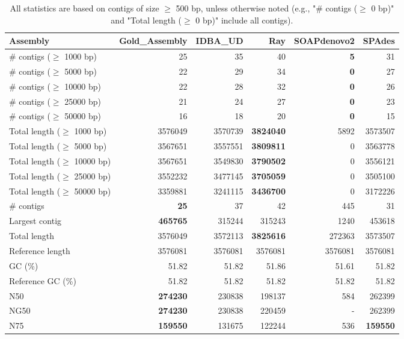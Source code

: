 \documentclass[12pt,a4paper]{article}
\begin{document}
\begin{table}[ht]
\begin{center}
\caption{All statistics are based on contigs of size $\geq$ 500 bp, unless otherwise noted (e.g., "\# contigs ($\geq$ 0 bp)" and "Total length ($\geq$ 0 bp)" include all contigs).}
\begin{tabular}{|l*{5}{|r}|}
\hline
Assembly & Gold\_Assembly & IDBA\_UD & Ray & SOAPdenovo2 & SPAdes \\ \hline
\# contigs ($\geq$ 1000 bp) & 25 & 35 & 40 & {\bf 5} & 31 \\ \hline
\# contigs ($\geq$ 5000 bp) & 22 & 29 & 34 & {\bf 0} & 27 \\ \hline
\# contigs ($\geq$ 10000 bp) & 22 & 28 & 32 & {\bf 0} & 26 \\ \hline
\# contigs ($\geq$ 25000 bp) & 21 & 24 & 27 & {\bf 0} & 23 \\ \hline
\# contigs ($\geq$ 50000 bp) & 16 & 18 & 20 & {\bf 0} & 15 \\ \hline
Total length ($\geq$ 1000 bp) & 3576049 & 3570739 & {\bf 3824040} & 5892 & 3573507 \\ \hline
Total length ($\geq$ 5000 bp) & 3567651 & 3557551 & {\bf 3809811} & 0 & 3563778 \\ \hline
Total length ($\geq$ 10000 bp) & 3567651 & 3549830 & {\bf 3790502} & 0 & 3556121 \\ \hline
Total length ($\geq$ 25000 bp) & 3552232 & 3477145 & {\bf 3705059} & 0 & 3505100 \\ \hline
Total length ($\geq$ 50000 bp) & 3359881 & 3241115 & {\bf 3436700} & 0 & 3172226 \\ \hline
\# contigs & {\bf 25} & 37 & 42 & 445 & 31 \\ \hline
Largest contig & {\bf 465765} & 315244 & 315243 & 1240 & 453618 \\ \hline
Total length & 3576049 & 3572113 & {\bf 3825616} & 272363 & 3573507 \\ \hline
Reference length & 3576081 & 3576081 & 3576081 & 3576081 & 3576081 \\ \hline
GC (\%) & 51.82 & 51.82 & 51.86 & 51.61 & 51.82 \\ \hline
Reference GC (\%) & 51.82 & 51.82 & 51.82 & 51.82 & 51.82 \\ \hline
N50 & {\bf 274230} & 230838 & 198137 & 584 & 262399 \\ \hline
NG50 & {\bf 274230} & 230838 & 220459 & - & 262399 \\ \hline
N75 & {\bf 159550} & 131675 & 122244 & 536 & {\bf 159550} \\ \hline

\end{tabular}
\end{center}
\end{table}
\end{document}
